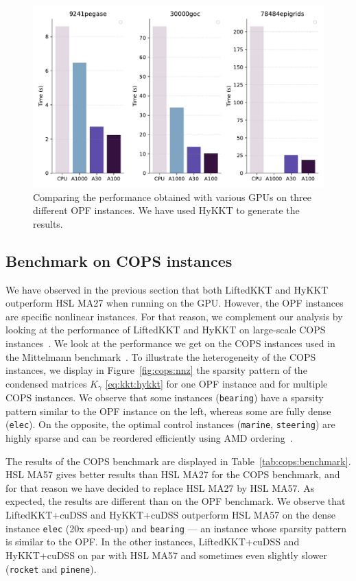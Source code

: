 \begin{figure}[!ht]
  \centering
  \includegraphics[width=.6\textwidth]{figures/benchmark_gpus.pdf}
  \caption{Comparing the performance obtained with various GPUs
    on three different OPF instances. We have used HyKKT to generate
    the results.
  \label{fig:gpubench}}
\end{figure}


\subsection{Benchmark on COPS instances}
\label{sec:num:cops}
We have observed in the previous section that both LiftedKKT
and HyKKT outperform HSL MA27 when running on the GPU.
However, the OPF instances are specific nonlinear instances.
For that reason, we complement our analysis by looking
at the performance of LiftedKKT and HyKKT on large-scale COPS instances~\cite{dolan2004benchmarking}.
We look at the performance we get on the COPS instances used in
the Mittelmann benchmark~\cite{mittelmann2002benchmark}.
To illustrate the heterogeneity of the COPS instances,
we display in Figure~\ref{fig:cops:nnz} the sparsity pattern of the
condensed matrices $K_\gamma$ \eqref{eq:kkt:hykkt} for one OPF instance and for multiple
COPS instances. We observe that some instances ({\tt bearing}) have a sparsity pattern
similar to the OPF instance on the left, whereas some are fully dense ({\tt elec}).
On the opposite, the optimal control instances ({\tt marine}, {\tt steering}) are
highly sparse and can be reordered efficiently using AMD ordering~\cite{amestoy-david-duff-2004}.

The results of the COPS benchmark are displayed in Table~\ref{tab:cops:benchmark}.
HSL MA57 gives better results than HSL MA27 for the COPS benchmark, and
for that reason we have decided to replace HSL MA27 by HSL MA57. As expected,
the results are different than on the OPF benchmark.
We observe that LiftedKKT+cuDSS and HyKKT+cuDSS outperform HSL MA57 on the dense instance {\tt elec}
(20x speed-up) and {\tt bearing}  --- an instance whose sparsity pattern
is similar to the OPF. In the other instances, LiftedKKT+cuDSS and HyKKT+cuDSS
on par with HSL MA57 and sometimes even slightly slower ({\tt rocket} and {\tt pinene}).


